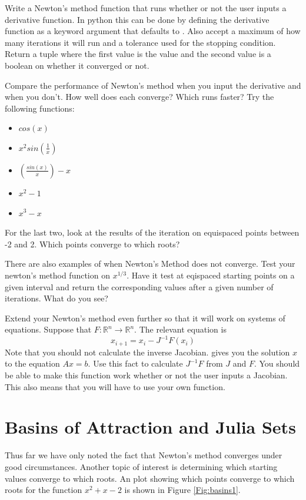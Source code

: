 \begin{problem}
\label{prob:newton_arr}
Write a Newton's method function that runs whether or not the user inputs a derivative function.
In python this can be done by defining the derivative function as a keyword argument that defaults to .
Also accept a maximum of how many iterations it will run and a tolerance used for the stopping condition.
Return a tuple where the first value is the value and the second value is a boolean on whether it converged or not.

Compare the performance of Newton's method when you input the derivative and when you don't.
How well does each converge?
Which runs faster?
Try the following functions:

\begin{itemize}
\item $cos(x)$
\item $x^2sin(\frac{1}{x})$
\item $(\frac{sin(x)}{x})-x$
\item $x^2-1$
\item $x^3 - x$
\end{itemize}

For the last two, look at the results of the iteration on equispaced points between -2 and 2.
Which points converge to which roots?

There are also examples of when Newton's Method does not converge.
Test your newton's method function on $x^{1/3}$.
Have it test at eqispaced starting points on a given interval and return the corresponding values after a given number of iterations.
What do you see?
\end{problem}

\begin{problem}
Extend your Newton's method even further so that it will work on systems of equations.
Suppose that $F: \mathbb{R}^n \rightarrow \mathbb{R}^n $.
The relevant equation is
\[
x_{i+1} = x_i - J^{-1}F(x_i)
\]
Note that you should not calculate the inverse Jacobian.
 gives you the solution $x$ to the equation $Ax=b$.
Use this fact to calculate $J^{-1}F$ from $J$ and $F$.
You should be able to make this function work whether or not the user inputs a Jacobian.
This also means that you will have to use your own  function.
\end{problem}

\section*{Basins of Attraction and Julia Sets}
Thus far we have only noted the fact that Newton's method converges under good circumstances.
Another topic of interest is determining which starting values converge to which roots.
An plot showing which points converge to which roots for the function $x^2 + x - 2$ is shown in Figure \ref{Fig:basins1}.

